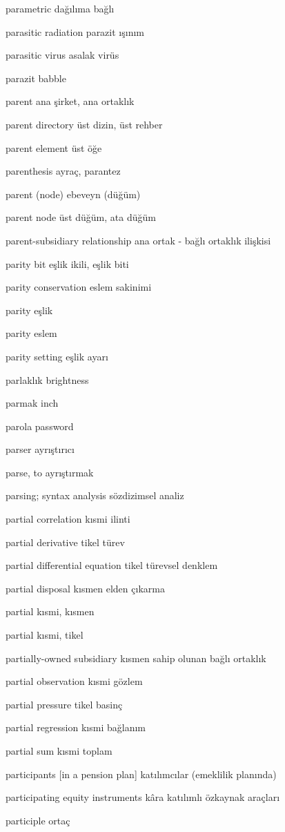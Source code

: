 \documentclass[12pt,fleqn]{article}\usepackage{../../common}
\begin{document}
parametric dağılıma bağlı

parasitic radiation parazit ışınım

parasitic virus asalak virüs

parazit babble

parent ana şirket, ana ortaklık

parent directory üst dizin, üst rehber

parent element üst öğe

parenthesis ayraç, parantez

parent (node) ebeveyn (düğüm)

parent node üst düğüm, ata düğüm

parent-subsidiary relationship ana ortak - bağlı ortaklık ilişkisi

parity bit eşlik ikili, eşlik biti

parity conservation eslem sakinimi

parity eşlik

parity eslem

parity setting eşlik ayarı

parlaklık brightness

parmak inch

parola password

parser ayrıştırıcı

parse, to ayrıştırmak

parsing; syntax analysis sözdizimsel analiz

partial correlation kısmi ilinti

partial derivative tikel türev

partial differential equation tikel türevsel denklem

partial disposal kısmen elden çıkarma

partial kısmi, kısmen

partial kısmi, tikel

partially-owned subsidiary kısmen sahip olunan bağlı ortaklık

partial observation kısmi gözlem

partial pressure tikel basinç

partial regression kısmi bağlanım

partial sum kısmi toplam

participants [in a pension plan] katılımcılar (emeklilik planında)

participating equity instruments kâra katılımlı özkaynak araçları

participle ortaç
\end{document}
